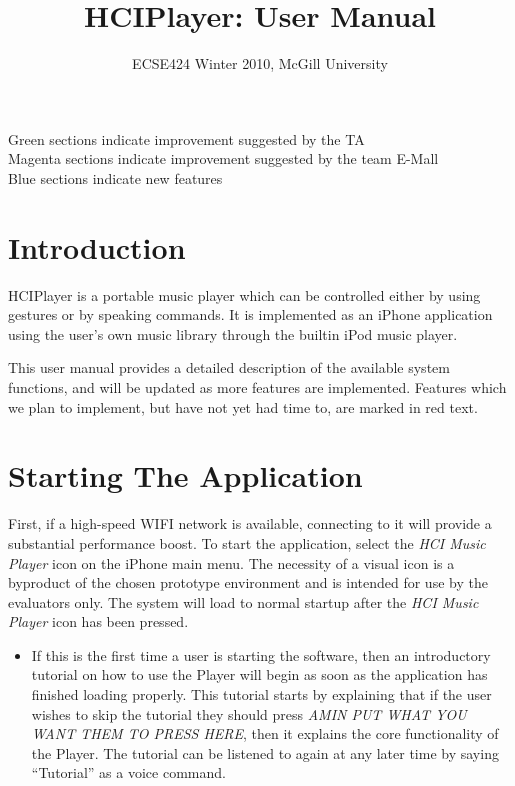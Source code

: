 \documentclass[12pt,letterpaper]{article}
\begin{document}
\title{HCIPlayer: User Manual}
\author{ECSE424 Winter 2010, McGill University}
\renewcommand{\today}{Updated: Wednesday, March 24th, 2010}
\maketitle

\begin{center}
{\color{green} Green} sections indicate improvement suggested by the TA \\
{\color{magenta} Magenta} sections indicate improvement suggested by the team E-Mall \\
{\color{blue} Blue} sections indicate new features
\end{center}

\section{Introduction}

HCIPlayer is a portable music player which can be controlled either by using gestures or by speaking commands. It is implemented as an iPhone application using the user's own music library through the builtin iPod music player.

This user manual provides a detailed description of the available system functions, and will be updated as more features are implemented. Features which we plan to implement, but have not yet had time to, are {\color{red} marked in red text}.

\section{Starting The Application}
First, if a high-speed WIFI network is available, connecting to it will provide a substantial performance boost. To start the application, select the \emph{HCI Music Player} icon on the iPhone main menu. The necessity of a visual icon is a byproduct of the chosen prototype environment and is intended for use by the evaluators only. The system will load to normal startup after the \emph{HCI Music Player} icon has been pressed.
\begin{itemize}
\item If this is the first time a user is starting the software, then an introductory tutorial on how to use the Player will begin as soon as the application has finished loading properly. This tutorial starts by explaining that if the user wishes to skip the tutorial they should press \textit{AMIN PUT WHAT YOU WANT THEM TO PRESS HERE}, then it explains the core functionality of the Player. {\color{blue} The tutorial can be listened to again at any later time by saying ``Tutorial'' as a voice command.}
\end{itemize}
\end{document}

